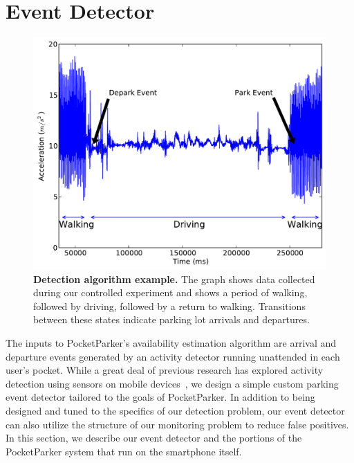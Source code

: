 \section{Event Detector}
\label{sec-detector}

\begin{figure}
\centering
\includegraphics[width=\columnwidth]{./figures/Detection.pdf}

\caption{\textbf{Detection algorithm example.} The graph shows data collected
during our controlled experiment and shows a period of walking, followed by
driving, followed by a return to walking. Transitions between these states
indicate parking lot arrivals and departures.}

\label{fig-detectionexample}
\end{figure}

The inputs to PocketParker's availability estimation algorithm are arrival and
departure events generated by an activity detector running unattended in each
user's pocket. While a great deal of previous research has explored activity
detection using sensors on mobile devices~\cite{Constandache:2010:DYS,
Keally:2011:PTP, Reddy:2010:UMP, Yang:2011:DDP, Wang:2009:FEE}, we design a
simple custom parking event detector tailored to the goals of PocketParker. In
addition to being designed and tuned to the specifics of our detection problem,
our event detector can also utilize the structure of our monitoring problem to
reduce false positives. In this section, we describe our event detector and the
portions of the PocketParker system that run on the smartphone itself.

